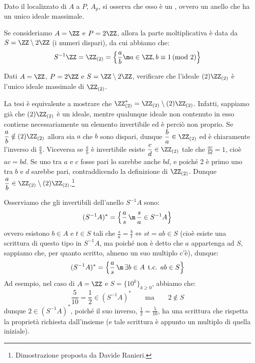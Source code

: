 \documentclass[11pt]{scrartcl}
\begin{document}
\begin{remark}
    Dato il localizzato di $A$ a $P$, $A_p$, si osserva che esso è un , ovvero un anello che ha un unico ideale massimale.
\end{remark}

\begin{example}
    Se consideriamo $A = \ZZ$ e $P = 2\ZZ$, allora la parte moltiplicativa è data da $S = \ZZ\setminus 2\ZZ$ (i numeri dispari), da cui abbiamo che:
    \[ S^{-1}\ZZ = \ZZ_{(2)} = \left\{\frac{a}{b} \m a \in \ZZ, b \equiv 1 \, \text{(mod 2)}\right\}
        \]
\end{example}

\begin{exercise}
    Dati $A = \ZZ$, $P = 2\ZZ$ e $S = \ZZ\setminus 2\ZZ$, verificare che l'ideale $(2)\ZZ_{(2)}$ è l'unico ideale massimale di $\ZZ_{(2)}$.
\end{exercise}

\begin{soln}
    La tesi è equivalente a mostrare che $\ZZ_{(2)}^*=\ZZ_{(2)}\setminus (2)\ZZ_{(2)}$. Infatti, sappiamo già che 
    $(2)\ZZ_{(2)}$ è un ideale, mentre qualunque ideale non contenuto in esso contiene necessariamente un elemento invertibile ed è perciò non proprio.
    Se $\displaystyle\frac{a}{b}\notin (2)\ZZ_{(2)}$ allora sia $a$ che $b$ sono dispari, dunque $\displaystyle\frac{b}{a}\in\ZZ_{(2)}$ ed è chiaramente l'inverso di $\displaystyle\frac{a}{b}$.
    Viceversa se $\displaystyle\frac{a}{b}$ è invertibile esiste $\displaystyle\frac{c}{d}\in\ZZ_{(2)}$ tale che $\displaystyle\frac{ac}{bd}=1$, cioè $ac=bd$. Se uno tra $a$ e $c$ fosse pari lo sarebbe
    anche $bd$, e poiché 2 è primo uno tra $b$ e $d$ sarebbe pari, contraddicendo la definizione di $\ZZ_{(2)}$. Dunque $\displaystyle\frac{a}{b}\in\ZZ_{(2)}\setminus (2)\ZZ_{(2)}$.\footnote{Dimostrazione proposta da Davide Ranieri.}
\end{soln}

\begin{remark}
    Osserviamo che gli invertibili dell'anello $S^{-1}A$ sono:
    \[ (S^{-1}A)^* = \left\{\frac{a}{s} \,\m\, \frac{s}{a} \in S^{-1}A\right\}
        \]
    ovvero esistono $b \in A$ e $t \in S$ tali che $\displaystyle \frac{s}{a} = \frac{b}{t} \iff st = ab \in S$ (cioè esiste una scrittura di questo tipo in $S^{-1}A$, ma poiché 
    non è detto che $a$ appartenga ad $S$, sappiamo che, per quanto scritto, almeno un suo multiplo c'è), dunque:
    \[ (S^{-1}A)^* = \left\{\frac{a}{s} \,\m\, \exists b \in A \;\, \text{t.c.} \;\, ab \in S\right\}
        \]
    Ad esempio, nel caso di $A = \ZZ$ e $S = \{10^k\}_{k\geq 0}$, abbiamo che:
    \[ \frac{5}{10}=\frac{1}{2} \in (S^{-1}A)^* \qquad \text{ma} \qquad 2 \not \in S
        \]
    dunque $2 \in (S^{-1}A)^*$, poiché il suo inverso, $\displaystyle \frac{1}{2} = \frac{5}{10}$, ha una scrittura che rispetta la proprietà richiesta dall'insieme (e tale scrittura è appunto un multiplo di quella iniziale).
\end{remark}
\end{document}
